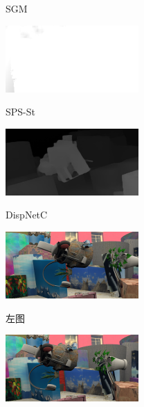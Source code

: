 \begin{figure}[htbp]
\begin{minipage}{0.3\linewidth}
		\vspace{-10pt}
		\centerline{SGM}
		\vspace{0.5in} %
	\end{minipage}
	\hfill
	\begin{minipage}{0.3\linewidth}
		\centerline{\includegraphics[width=2in]{figures/cmp_ft3d/sps_000}}
		\vspace{-10pt}
		\centerline{SPS-St}
		\vspace{0.5in} %
	\end{minipage}
	\hfill
	\begin{minipage}{0.3\linewidth}
		\centerline{\includegraphics[width=2in]{figures/cmp_ft3d/pred_000}}
		\vspace{-10pt}
		\centerline{DispNetC}
		\vspace{0.5in} %
	\end{minipage}
	\begin{minipage}{0.3\linewidth}
		\centerline{\includegraphics[width=2in]{figures/cmp_ft3d/l_005}}
		\vspace{-10pt}
		\centerline{左图}
	\end{minipage}
	\hfill
	\begin{minipage}{.3\linewidth}
		\centerline{\includegraphics[width=2in]{figures/cmp_ft3d/r_005}}

\end{minipage}
\end{figure}
